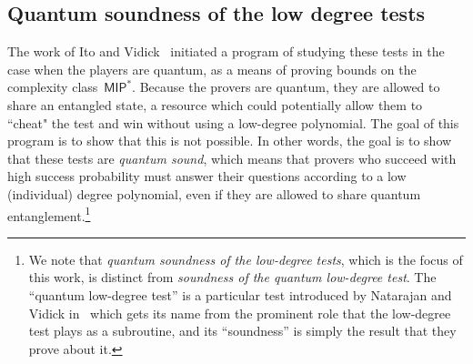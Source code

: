 \documentclass[11pt]{article}
\theoremstyle{definition}
\newcommand{\MIP}{\mathsf{MIP}}
\begin{document}
\subsection{Quantum soundness of the low degree tests}

The work of Ito and Vidick~\cite{IV12}
initiated a program of studying these tests
in the case when the players are quantum,
as a means of proving bounds on the complexity class~$\MIP^*$.
Because the provers are quantum,
they are allowed to share an entangled state,
a resource which could potentially allow them to ``cheat" the test
and win without using a low-degree polynomial.
The goal of this program is to show that this is not possible.
In other words, the goal is to show that these tests are \emph{quantum sound},
which means that provers who succeed with high success probability
must answer their questions according to a low (individual) degree polynomial,
even if they are allowed to share quantum entanglement.\footnote{We note that \emph{quantum soundness of the low-degree tests}, which is the focus of this work,
is distinct from \emph{soundness of the quantum low-degree test}.
The ``quantum low-degree test'' is a particular test introduced by Natarajan and Vidick in~\cite{NV18a}
which gets its name from the prominent role that the low-degree test plays as a subroutine,
and its ``soundness'' is simply the result that they prove about it.
}
\end{document}
